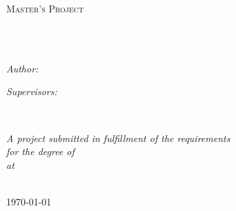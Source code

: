 \documentclass[
11pt, %
english, %
singlespacing, %
headsepline, %
]{MastersDoctoralThesis} %
\author{Matthew \textsc{Tiger}}
\begin{document}


\frontmatter %

\pagestyle{plain} %


\begin{titlepage}
\begin{center}

\vspace*{.06\textheight}
{\scshape\LARGE \univname\par}\vspace{1.5cm} %
\textsc{\Large Master's Project}\\[0.5cm] %

\HRule \\[0.4cm] %
{\huge \bfseries \ttitle\par}\vspace{0.4cm} %
\HRule \\[1.5cm] %

\begin{minipage}[t]{0.4\textwidth}
\begin{flushleft} \large
\emph{Author:}\\
{\authorname} %
\end{flushleft}
\end{minipage}
\begin{minipage}[t]{0.4\textwidth}
\begin{flushright} \large
\emph{Supervisors:} \\
{\supname} %
\end{flushright}\end{minipage}\\[3cm]

\vfill

\large \textit{A project submitted in fulfillment of the requirements\\ for the degree of \degreename}\\[0.3cm] %
\textit{at}\\[0.4cm]
\univname\\[2cm] %

\vfill

{\large \today}\\[4cm] %

\vfill
\end{center}
\end{titlepage}
\end{document}
